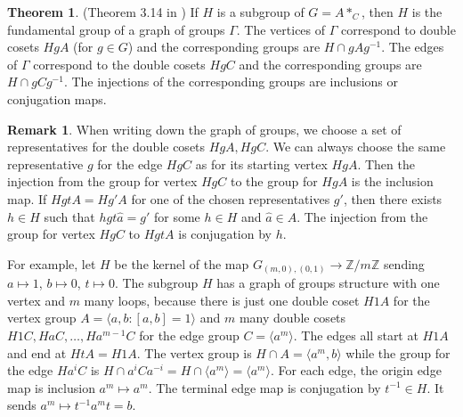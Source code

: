 \documentclass[10pt]{article}
\def\integers{{\mathbb{Z}}}
\theoremstyle{definition}
\newtheorem{theorem}{Theorem}
\newtheorem{remark}{Remark}
\begin{document}
\begin{theorem} (Theorem 3.14 in \cite{ScottWall}) If $H$ is a subgroup of $G = A*_C$, then $H$ is the fundamental group of a graph of groups $\Gamma$. The vertices of $\Gamma$ correspond to double cosets $HgA$ (for $g\in G$) and the corresponding groups are $H \cap gAg^{-1}$. The edges of $\Gamma$ correspond to the double cosets $HgC$ and the corresponding groups are $H \cap gCg^{-1}$. The injections of the corresponding groups are inclusions or conjugation maps. 
\end{theorem}

\begin{remark}
 When writing down the graph of groups, we choose a set of representatives for the double cosets $HgA, HgC$. We can always choose the same representative $g$ for the edge $HgC$ as for its starting vertex $HgA$. Then the injection from the group for vertex $HgC$ to the group for $HgA$ is the inclusion map. If $HgtA=Hg'A$ for one of the chosen representatives $g'$, then there exists $h\in H$ such that $h gt \widehat{a} = g'$ for some $h\in H$ and $\widehat{a}\in A$. 
 The injection from the group for vertex $HgC$ to $HgtA$ is conjugation by $h$. 
\end{remark}

\begin{center}
 \end{center}


For example, let $H$ be the kernel of the map $G_{(m,0),(0,1)}\to \integers/m\integers$ sending $a\mapsto 1$, $b \mapsto 0$, $t \mapsto 0$. The subgroup $H$ has a graph of groups structure with one vertex and $m$ many loops, because there is just one double coset $H1A$ for the vertex group $A= \langle a,b:[a,b]=1\rangle$ and $m$ many double cosets $H1C, HaC, \dots, Ha^{m-1}C$ for the edge group $C=\langle a^m \rangle$. The edges all start at $H1A$ and end at $HtA=H1A$. The vertex group is $H\cap A = \langle a^m, b \rangle$ while the group for the edge $H a^i C$ is $H \cap a^i C a^{-i} = H \cap \langle a^m \rangle = \langle a^m \rangle$. For each edge, the origin edge map is inclusion $a^m \mapsto a^m$. The terminal edge map is conjugation by $t^{-1}\in H$. It sends $a^m \mapsto t^{-1} a^m t = b$. 
\end{document}
